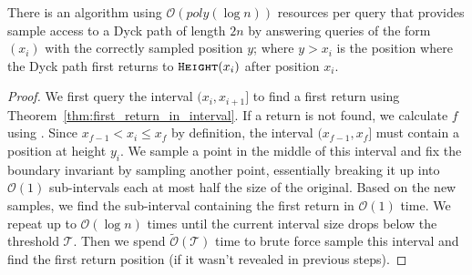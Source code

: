 \begin{theorem}
\label{thm:dyck_first_return_sampling}
There is an algorithm using $\mathcal O(poly(\log n))$ resources per query that provides sample access to a Dyck path of length $2n$
by answering queries of the form $(x_i)$ with the correctly sampled position $y$;
where $y>x_i$ is the position where the Dyck path first returns to $\texttt{\textsc{Height}}(x_i)$ after position $x_i$.
\end{theorem}
\begin{proof}
We first query the interval $(x_i,x_{i+1}]$ to find a first return using Theorem~\ref{thm:first_return_in_interval}.
If a return is not found, we calculate $f$ using .
Since $x_{f-1}<x_i\le x_f$ by definition, the interval $(x_{f-1},x_f]$ must contain a position at height $y_i$.
We sample a point in the middle of this interval and fix the boundary invariant by sampling another point,
essentially breaking it up into $\mathcal O(1)$ sub-intervals each at most half the size of the original.
Based on the new samples, we find the sub-interval containing the first return in $\mathcal O(1)$ time.
We repeat up to $\mathcal O(\log n)$ times until the current interval size drops below the threshold $\mathcal T$.
Then we spend $\tilde{\mathcal O}(\mathcal T)$ time to brute force sample this interval and find the first return position (if it wasn't revealed in previous steps).
\end{proof}
